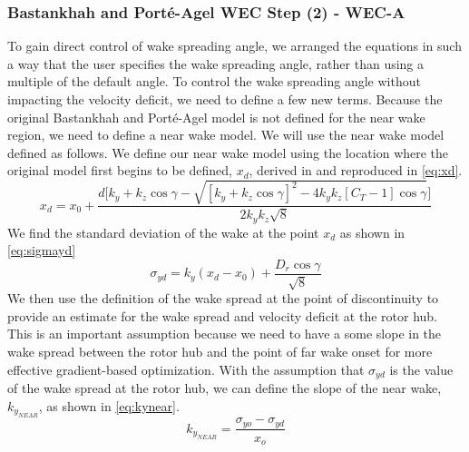 \documentclass[a4paper]{jpconf}
\begin{document}
\subsubsection{Bastankhah and Port\'e-Agel WEC Step (2) - WEC-A}
 To gain direct control of wake spreading angle, we arranged the equations in such a way that the user specifies the wake spreading angle, rather than using a multiple of the default angle. To control the wake spreading angle without impacting the velocity deficit, we need to define a few new terms.
%
Because the original Bastankhah and Port\'{e}-Agel model is not defined for the near wake region, we need to define a near wake model. We will use the near wake model defined as follows. We define our near wake model using the location where the original model first begins to be defined, $x_d$, derived in \cite{thomas2019-les-validation} and reproduced in \cref{eq:xd}.
%
\begin{equation}\label{eq:xd}
x_d = x_0 + \frac{d\Bigg[k_y+k_z\cos{\gamma} - \sqrt{[k_y+k_z\cos{\gamma}]^2-4k_y k_z[C_T-1]\cos{\gamma}}\Bigg]}{2k_y k_z\sqrt{8}}
\end{equation}
%
We find the standard deviation of the wake at the point $x_d$ as shown in \cref{eq:sigmayd}
%
\begin{equation}\label{eq:sigmayd}
\sigma_{yd} = k_y (x_d - x_0) + \frac{D_r \cos{\gamma}}{\sqrt{8}}
\end{equation}
%
We then use the definition of the wake spread at the point of discontinuity to provide an estimate for the wake spread and velocity deficit at the rotor hub. This is an important assumption because we need to have a some slope in the wake spread between the rotor hub and the point of far wake onset for more effective gradient-based optimization. With the assumption that $\sigma_{yd}$ is the value of the wake spread at the rotor hub, we can define the slope of the near wake, $k_{y_{NEAR}}$, as shown in \cref{eq:kynear}.
%
\begin{equation}\label{eq:kynear}
k_{y_{NEAR}} = \frac{\sigma_{yo}-\sigma_{yd}}{x_o}
\end{equation}
\end{document}
